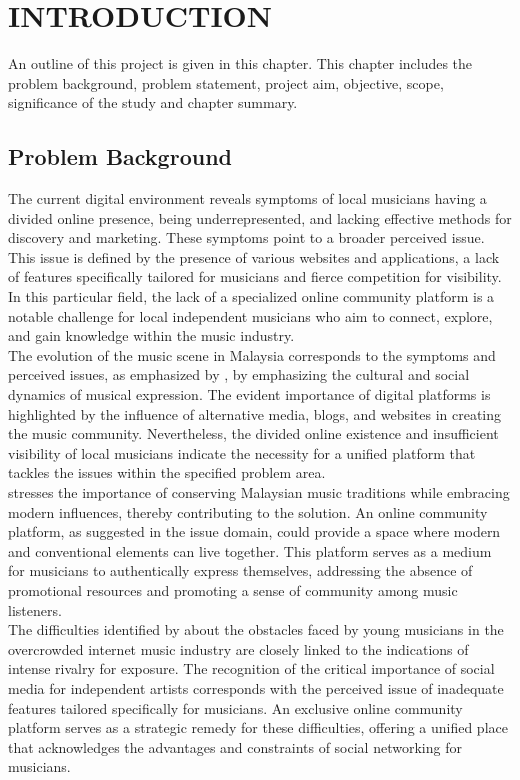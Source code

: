 \chapter{INTRODUCTION}
\label{ch:intro}
An outline of this project is given in this chapter. This chapter includes the problem background, problem statement, project aim, objective, scope, significance of the study and chapter summary.

\section{Problem Background}
The current digital environment reveals symptoms of local musicians having a divided online presence, being underrepresented, and lacking effective methods for discovery and marketing. These symptoms point to a broader perceived issue. This issue is defined by the presence of various websites and applications, a lack of features specifically tailored for musicians and fierce competition for visibility. In this particular field, the lack of a specialized online community platform is a notable challenge for local independent musicians who aim to connect, explore, and gain knowledge within the music industry. \\

The evolution of the music scene in Malaysia corresponds to the symptoms and perceived issues, as emphasized by \textcite{ong19}, by emphasizing the cultural and social dynamics of musical expression. The evident importance of digital platforms is highlighted by the influence of alternative media, blogs, and websites in creating the music community. Nevertheless, the divided online existence and insufficient visibility of local musicians indicate the necessity for a unified platform that tackles the issues within the specified problem area. \\

\textcite{mohd21} stresses the importance of conserving Malaysian music traditions while embracing modern influences, thereby contributing to the solution. An online community platform, as suggested in the issue domain, could provide a space where modern and conventional elements can live together. This platform serves as a medium for musicians to authentically express themselves, addressing the absence of promotional resources and promoting a sense of community among music listeners. \\

The difficulties identified by \textcite{haynes18} about the obstacles faced by young musicians in the overcrowded internet music industry are closely linked to the indications of intense rivalry for exposure. The recognition of the critical importance of social media for independent artists corresponds with the perceived issue of inadequate features tailored specifically for musicians. An exclusive online community platform serves as a strategic remedy for these difficulties, offering a unified place that acknowledges the advantages and constraints of social networking for musicians. \\

